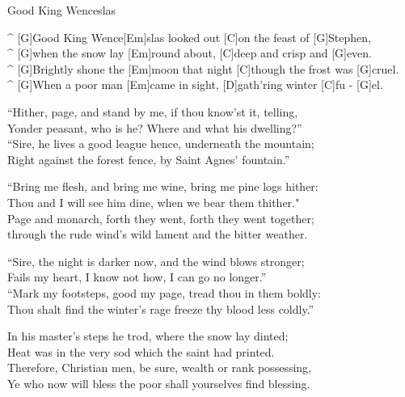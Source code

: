 \begin{song}{Good King Wenceslas}{}

\begin{guitar}
^ [G]Good King Wence[Em]slas looked out [C]on the feast of [G]Stephen,\\
^ [G]when the snow lay [Em]round about, [C]deep and crisp and [G]even.\\
^ [G]Brightly shone the [Em]moon that night [C]though the frost was [G]cruel.\\
^ [G]When a poor man [Em]came in sight, [D]gath'ring winter [C]fu - [G]el.\\
\end{guitar}

\begin{guitar}
“Hither, page, and stand by me, if thou know'st it, telling,\\
Yonder peasant, who is he? Where and what his dwelling?”\\
“Sire, he lives a good league hence, underneath the mountain;\\
Right against the forest fence, by Saint Agnes' fountain.”\\
\end{guitar}

\begin{guitar}
“Bring me flesh, and bring me wine, bring me pine logs hither:\\
Thou and I will see him dine, when we bear them thither."\\
Page and monarch, forth they went, forth they went together;\\
through the rude wind's wild lament and the bitter weather.\\
\end{guitar}

\begin{guitar}
“Sire, the night is darker now, and the wind blows stronger;\\
Fails my heart, I know not how, I can go no longer.”\\
“Mark my footsteps, good my page, tread thou in them boldly:\\
Thou shalt find the winter's rage freeze thy blood less coldly.”\\
\end{guitar}

\begin{guitar}
In his master's steps he trod, where the snow lay dinted;\\
Heat was in the very sod which the saint had printed.\\
Therefore, Christian men, be sure, wealth or rank possessing,\\
Ye who now will bless the poor shall yourselves find blessing.\\
\end{guitar}
\end{song}
